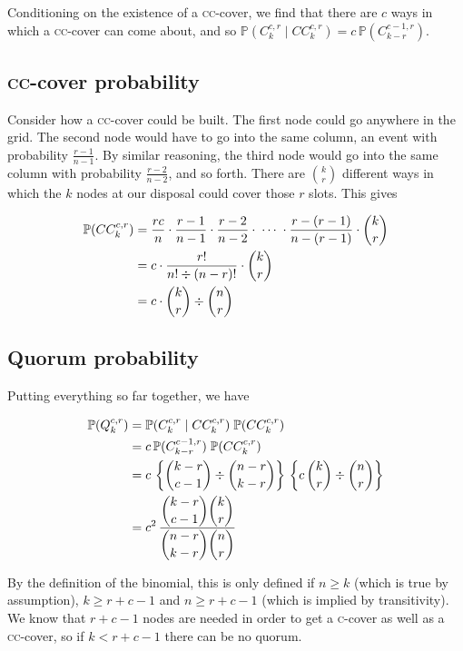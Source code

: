 \documentclass[10pt]{scrartcl}
\begin{document}
Conditioning on the existence of a \textsc{cc}-cover, we find that there are \(c\) ways in which a \textsc{cc}-cover can come about, and so \(\mathbb{P}(C^{c,r}_k\;|\;CC^{c,r}_k) = c \, \mathbb{P}(C^{c-1,r}_{k-r}) \).

\subsection{\textsc{cc}-cover probability}

Consider how a \textsc{cc}-cover could be built. The first node could go anywhere in the grid. The second node would have to go into the same column, an event with probability \(\frac{r-1}{n-1}\). By similar reasoning, the third node would go into the same column with probability \(\frac{r-2}{n-2}\), and so forth. There are \(\binom{k}{r}\) different ways in which the \(k\) nodes at our disposal could cover those \(r\) slots. This gives

\begin{align*}
    \mathbb{P}(CC^{c,r}_k) &= \frac{r c}{n} \cdot \frac{r-1}{n-1} \cdot \frac{r-2}{n-2} \cdot \; \cdots \; \cdot \frac{r-(r-1)}{n-(r-1)} \cdot \dbinom{k}{r} \\
    &= c \cdot \frac{r!}{n! \div (n-r)!} \cdot \dbinom{k}{r} \\
    &= c \cdot \dbinom{k}{r} \div \dbinom{n}{r}
\end{align*}

\subsection{Quorum probability}

Putting everything so far together, we have

\begin{align*}
    \mathbb{P}(Q^{c,r}_k)
    &= \mathbb{P}(C^{c,r}_k\;|\;CC^{c,r}_k) \; \mathbb{P}(CC^{c,r}_k) \\
    &= c \, \mathbb{P}(C^{c-1,r}_{k-r}) \; \mathbb{P}(CC^{c,r}_k) \\
    &= c \, \left\{\dbinom{k-r}{c-1} \div \dbinom{n-r}{k-r}\right\} \, \left\{c \, \dbinom{k}{r} \div \dbinom{n}{r}\right\} \\
    &= c^2 \, \frac{\dbinom{k-r}{c-1} \dbinom{k}{r}}{\dbinom{n-r}{k-r} \dbinom{n}{r}}
\end{align*}

By the definition of the binomial, this is only defined if \(n \geq k\) (which is true by assumption), \(k \geq r+c-1\) and \(n \geq r+c-1\) (which is implied by transitivity). We know that \(r+c-1\) nodes are needed in order to get a \textsc{c}-cover as well as a \textsc{cc}-cover, so if \(k < r+c-1\) there can be no quorum.
\end{document}
